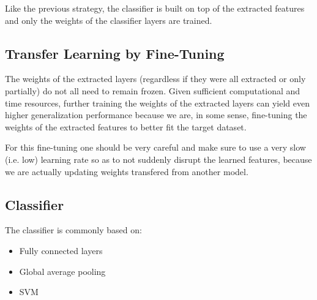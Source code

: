 Like the previous strategy, the classifier is built on top of the extracted features and only the weights of the classifier layers are trained.

\subsection{Transfer Learning by Fine-Tuning}

The weights of the extracted layers (regardless if they were all extracted or only partially) do not all need to remain frozen. Given sufficient computational and time resources, further training the weights of the extracted layers can yield even higher generalization performance because we are, in some sense, fine-tuning the weights of the extracted features to better fit the target dataset.

For this fine-tuning one should be very careful and make sure to use a very slow (i.e. low) learning rate so as to not suddenly disrupt the learned features, because we are actually updating weights transfered from another model.

\subsection{Classifier}

The classifier is commonly based on:

\begin{itemize}
    \item Fully connected layers
    \item Global average pooling
    \item SVM
\end{itemize}
